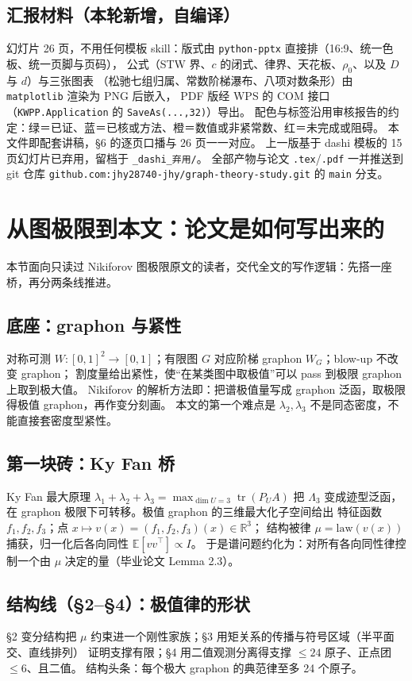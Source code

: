 \documentclass[UTF8,11pt]{ctexart}
\newcommand{\file}[1]{\texttt{#1}}
\begin{document}
\subsection{汇报材料（本轮新增，自编译）}

幻灯片 26 页，不用任何模板 skill：版式由 \file{python-pptx} 直接排（16:9、统一色板、统一页脚与页码），
公式（STW 界、$c$ 的闭式、律界、天花板、$\rho_0$、以及 $D$ 与 $d$）与三张图表
（松驰七组归属、常数阶梯瀑布、八项对数条形）由 \file{matplotlib} 渲染为 PNG 后嵌入，
PDF 版经 WPS 的 COM 接口（\file{KWPP.Application} 的 \file{SaveAs(...,32)}）导出。
配色与标签沿用审核报告的约定：绿＝已证、蓝＝已核或方法、橙＝数值或非紧常数、红＝未完成或阻碍。
本文件即配套讲稿，\S6 的逐页口播与 26 页一一对应。
上一版基于 dashi 模板的 15 页幻灯片已弃用，留档于 \file{\_dashi\_弃用/}。
全部产物与论文 \file{.tex}/\file{.pdf} 一并推送到 git 仓库
\file{github.com:jhy28740-jhy/graph-theory-study.git} 的 \file{main} 分支。

\section{从图极限到本文：论文是如何写出来的}

本节面向只读过 Nikiforov 图极限原文的读者，交代全文的写作逻辑：先搭一座桥，再分两条线推进。

\subsection{底座：graphon 与紧性}
对称可测 $W:[0,1]^2\to[0,1]$；有限图 $G$ 对应阶梯 graphon $W_G$；blow-up 不改变 graphon；
割度量给出紧性，使``在某类图中取极值''可以 pass 到极限 graphon 上取到极大值。
Nikiforov 的解析方法即：把谱极值量写成 graphon 泛函，取极限得极值 graphon，再作变分刻画。
本文的第一个难点是 $\lambda_2,\lambda_3$ 不是同态密度，不能直接套密度型紧性。

\subsection{第一块砖：Ky Fan 桥}
Ky Fan 最大原理 $\lambda_1+\lambda_2+\lambda_3=\max_{\dim U=3}\operatorname{tr}(P_U A)$
把 $\Lambda_3$ 变成迹型泛函，在 graphon 极限下可转移。极值 graphon 的三维最大化子空间给出
特征函数 $f_1,f_2,f_3$；点 $x\mapsto v(x)=(f_1,f_2,f_3)(x)\in\mathbb R^3$；
结构被律 $\mu=\mathrm{law}(v(x))$ 捕获，归一化后各向同性 $\mathbb E[vv^\top]\propto I$。
于是谱问题约化为：对所有各向同性律控制一个由 $\mu$ 决定的量（毕业论文 Lemma 2.3）。

\subsection{结构线（\S2--\S4）：极值律的形状}
\S2 变分结构把 $\mu$ 约束进一个刚性家族；\S3 用矩关系的传播与符号区域（半平面交、直线排列）
证明支撑有限；\S4 用二值观测分离得支撑 $\le 24$ 原子、正点团 $\le 6$、且二值。
结构头条：每个极大 graphon 的典范律至多 24 个原子。
\end{document}
